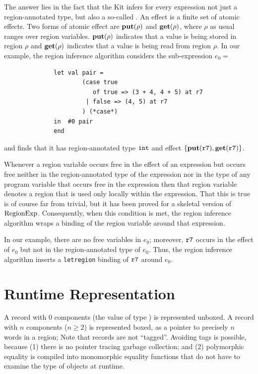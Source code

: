 \documentclass[12pt]{book}
\begin{document}
The answer lies in the fact that the Kit infers for every expression
not just a region-annotated type, but also a so-called . 
An effect is a finite set of 
atomic effects. Two forms of atomic
effect are $\mathop{\bf put}\nolimits(\rho)$ and $\mathop{\bf get}\nolimits(\rho)$, where $\rho$ as usual ranges
over region variables. $\mathop{\bf put}\nolimits(\rho)$ indicates that a value is being stored in
region $\rho$ and $\mathop{\bf get}\nolimits(\rho)$ indicates that a value is being read from region $\rho$.
In our example, the region inference algorithm considers the sub-expression $e_0 = $
\begin{verbatim}
              let val pair = 
                      (case true 
                         of true => (3 + 4, 4 + 5) at r7 
                       | false => (4, 5) at r7
                      ) (*case*) 
              in  #0 pair
              end  \end{verbatim}
and finds that it has region-annotated type $\hbox{\tt int}$ and effect
$\{\mathop{\bf put}\nolimits(\hbox{\tt r7}), \mathop{\bf get}\nolimits(\hbox{\tt r7})\}$.

Whenever a region variable occurs free in the effect of an expression but occurs
free neither in the region-annotated type of the expression nor in the type of any
program variable that occurs free in the expression then that region variable denotes
a region that is used only locally within the expression.  
That this is true is of course far from trivial, but it
has been proved for a skeletal version of $\hbox{\rm RegionExp}$.  Consequently, 
when this condition is met, the region inference
algorithm wraps a  binding of the region variable
around that expression.

In our example, there are no free variables in $e_0$; moreover, $\hbox{\tt r7}$
occurs in the effect of $e_0$ but not in the region-annotated type of $e_0$. Thus,
the region inference algorithm inserts a {\tt letregion} binding of $\hbox{\tt r7}$
around $e_0$.

\section{Runtime Representation}
A record with 0 components (the value of type ) 
is represented unboxed.
A record with $n$ components ($n\geq 2$) is represented boxed, as a pointer to
precisely $n$ words in a region;
Note that records are not ``tagged''. Avoiding tags is possible, because
(1) there is no pointer tracing garbage collection; and (2) 
polymorphic equality is 
compiled into monomorphic 
equality functions that do not have
to examine the type of objects at runtime. 
\end{document}
